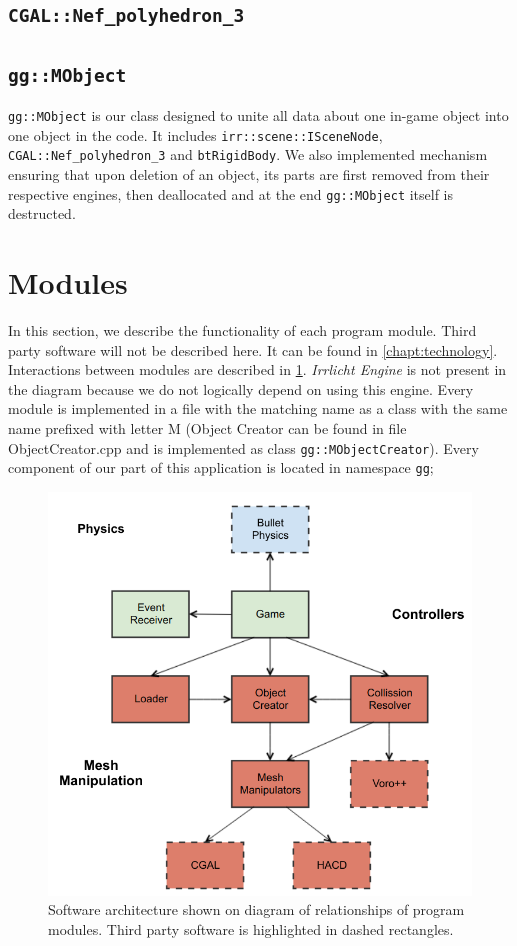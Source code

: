 \subsection*{\tt CGAL::Nef\_polyhedron\_3}

\subsection*{\tt gg::MObject} 
{\tt gg::MObject} is our class designed to unite all data about one in-game object into one object in the code. It includes {\tt irr::scene::ISceneNode}, {\tt CGAL::Nef\_polyhedron\_3} and {\tt btRigidBody}. We also implemented mechanism ensuring that upon deletion of an object, its parts are first removed from their respective engines, then deallocated and at the end {\tt gg::MObject} itself is destructed.




\section{Modules}
In this section, we describe the functionality of each program module. Third party software will not be described here. It can be found in \cref{chapt:technology}. Interactions between modules are described in \cref{fig:modules}. \emph{Irrlicht Engine} is not present in the diagram because we do not logically depend on using this engine. Every module is implemented in a file with the matching name as a class with the same name prefixed with letter M (Object Creator can be found in file ObjectCreator.cpp and is implemented as class {\tt gg::MObjectCreator}). Every component of our part of this application is located in namespace {\tt gg};

\begin{figure}
        \centering
        \includegraphics[width=\textwidth]{img/objectmodel}
        \caption{Software architecture shown on diagram of relationships of program modules. Third party software is highlighted in dashed rectangles.}
        \label{fig:modules}
\end{figure}


